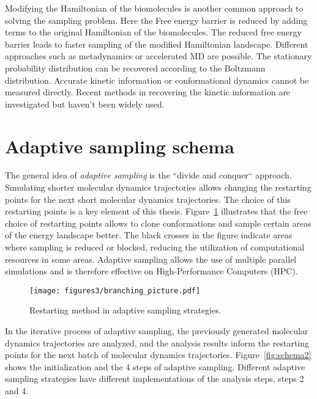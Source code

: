 Modifying the Hamiltonian of the biomolecules is another common approach to solving the sampling problem. Here the Free energy barrier is reduced by adding terms to the original Hamiltonian of the biomolecules.
The reduced free energy barrier leads to faster sampling of the modified Hamiltonian landscape. Different approaches such as metadynamics \cite{laio2008metadynamics} or accelerated MD\cite{hamelberg2004accelerated} are possible. The stationary probability distribution can be recovered according to the Boltzmann distribution. Accurate kinetic information or conformational dynamics cannot be measured directly. Recent methods in recovering the kinetic information\cite{pathreweight1, pathreweight2, pathreweight3, pathreweight4} are investigated but haven't been widely used. 



\section{\label{sec:design}Adaptive sampling schema}


The general idea of \emph{adaptive sampling} \cite{singhal2005error, bowman2010enhanced,
weber2011characterization, Fabritiis-2014, preto2014fast, doerr2016htmd,
AdaptivePELE-Lecina2017, EvolutionCoupling-Shamsi2017, FAST-Bowman-2015, 
Strategies-erros-reduce, plattner2017complete, Adstrategies2018} is the ``divide and conquer`` approach. Simulating shorter molecular dynamics trajectories allows changing the restarting points for the next short molecular dynamics trajectories. The choice of this restarting points is a key element of this thesis. Figure~\ref{fig:branching} illustrates that the free choice of restarting points allows to clone conformations and sample certain areas of the energy landscape better. The black crosses in the figure indicate areas where sampling is reduced or blocked, reducing the utilization of computational resources in some areas.
Adaptive sampling allows the use of multiple parallel simulations and is therefore effective on High-Performance Computers (HPC).

\begin{figure}[h]
  \centering
  \texttt{[image: figures3/branching\_picture.pdf]}
  \caption{Restarting method in adaptive sampling strategies.}
  \label{fig:branching}
\end{figure}


In the iterative process of adaptive sampling, the previously generated molecular dynamics trajectories are analyzed, and the analysis results inform the restarting points for the next batch of
molecular dynamics trajectories. Figure~\ref{fig:schema2} shows the initialization and the 4 steps of adaptive sampling. Different adaptive sampling strategies have different implementations of the analysis steps, steps 2 and 4. 

